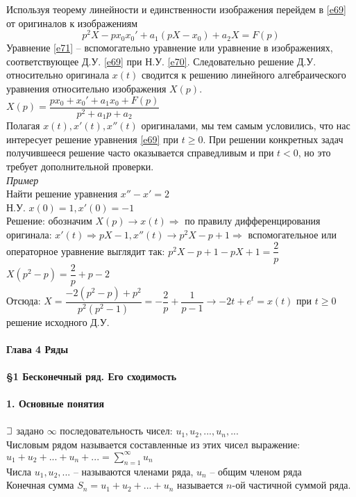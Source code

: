 \documentclass{article}
\numberwithin{equation}{section}
\def\letus{%
    \mathord{\setbox0=\hbox{$\exists$}%
             \hbox{\kern 0.125\wd0%
                   \vbox to \ht0{%
                      \hrule width 0.75\wd0%
                      \vfill%
                      \hrule width 0.75\wd0}%
                   \vrule height \ht0%
                   \kern 0.125\wd0}%
           }%
}
\begin{document}
Используя теорему линейности и единственности изображения перейдем в \eqref{e69} от оригиналов к изображениям
\begin{equation}\label{e71}
p^2X-px_0x_0'+a_1(pX-x_0)+a_2X=F(p)
\end{equation}
Уравнение \eqref{e71} -- вспомогательно уравнение или уравнение в изображениях, соответствующее Д.У. \eqref{e69} при Н.У. \eqref{e70}. Следовательно решение Д.У. относительно оригинала $x(t)$ сводится к решению линейного алгебраического уравнения относительно изображения $X(p)$.\\
$X(p)=\dfrac{px_0+x_0'+a_1x_0+F(p)}{p^2+a_1p+a_2}$\\
Полагая $x(t),x'(t),x''(t)$ оригиналами, мы тем самым условились, что нас интересует решение уравнения \eqref{e69} при $t\geqslant0$. При решении конкретных задач получившееся решение часто оказывается справедливым и при $t<0$, но это требует дополнительной проверки.\\
\textit{Пример}\\
Найти решение уравнения $x''-x'=2$\\
Н.У. $x(0)=1,x'(0)=-1$\\
Решение: обозначим $X(p)\rightarrow x(t)\Rightarrow$ по правилу дифференцирования оригинала: $x'(t)\Rightarrow pX-1,x''(t)\rightarrow p^2X-p+1\Rightarrow$ вспомогательное или операторное уравнение выглядит так:
$p^2X-p+1-pX+1=\dfrac{2}{p}$\\
$X(p^2-p)=\dfrac{2}{p}+p-2$\\
Отсюда: $X=\dfrac{-2(p^2-p)+p^2}{p^2(p^2-1)}=-\dfrac{2}{p}+\dfrac{1}{p-1}\rightarrow-2t+e^t=x(t)$ при $t\geqslant0$ решение исходного Д.У.
\\\\
\textbf{\Large{Глава 4 Ряды}}
\\\\
\textbf{\large{\S1 Бесконечный ряд. Его сходимость}}
\\\\
\textbf{1. Основные понятия}
\\\\
$\letus$ задано $\infty$ последовательность чисел: $u_1,u_2,...,u_n,...$\\
Числовым рядом называется составленные из этих чисел выражение: $u_1+u_2+...+u_n+...=\sum\limits_{n=1}^\infty u_n$\\
Числа $u_1,u_2,...$ -- называются членами ряда, $u_n$ -- общим членом ряда\\
Конечная сумма $S_n=u_1+u_2+...+u_n$ называется $n$-ой частичной суммой ряда.\\
\end{document}
